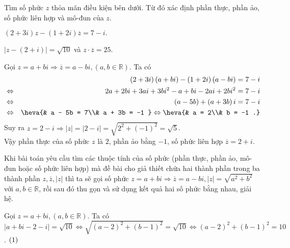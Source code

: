 \begin{vd} %
	Tìm số phức $z$ thỏa mãn điều kiện bên dưới. Từ đó xác định phần thực, phần ảo, số phức liên hợp và mô-đun của $z$.
	\begin{enumEX}{1}
		\item  $ \left( 2 + 3i \right)z - \left( 1 + 2i \right)\overline{z} = 7 - i.$
		\item 	%
		$\left| z - \left( 2 + i \right)\right| = \sqrt{10}$ và $z \cdot \overline{z} = 25$.
	\end{enumEX}
	\loigiai
	{\begin{enumEX}{1}
			\item	Gọi $z = a + bi \Rightarrow \overline{z} = a - bi, \left(a, b \in \mathbb{R}\right)$.  Ta có
			\begin{eqnarray*}
				&	& \left( 2 + 3i \right) \left( a + bi \right) - \left( 1 + 2i \right)\left( a - bi \right) = 7 - i \\
				&	\Leftrightarrow  &2a + 2bi + 3ai + 3bi^2 - a + bi - 2ai +2bi^2 = 7 - i \\ 
				&	\Leftrightarrow & \left( a - 5b \right) + \left( a+ 3b \right)i = 7 - i \\
				& \Leftrightarrow & \heva{& a - 5b = 7\\& a + 3b = -1 } \Leftrightarrow  \heva{& a = 2\\& b = -1 .} 
			\end{eqnarray*} 
			Suy ra $z = 2 - i \Rightarrow \left| z \right| = \left| 2 - i \right| = \sqrt{ 2^2 + \left( - 1 \right)^2} = \sqrt{5}$. \\
			Vậy phần thực của số phức $z$ là $2$, phần ảo bằng $-1$, số phức liên hợp $\overline{z} = 2 + i$.
			\begin{nx}
				Khi bài toán yêu cầu tìm các thuộc tính của số phức (phần thực, phần ảo,
				mô-đun hoặc số phức liên hợp) mà đề bài cho giả thiết chứa hai thành phần trong ba
				thành phần $z, \overline{z}, \left| z \right|$ thì ta sẽ gọi số phức $z = a + bi \Rightarrow \overline{z} = a - bi, \left| z \right| = \sqrt{a^2 + b^2}$ với $a, b \in \mathbb{R}$, rồi sau đó thu gọn và sử dụng kết quả hai số phức bằng nhau, giải hệ.
			\end{nx} 
			\item Gọi $z = a + bi, \left(a, b \in \mathbb{R}\right)$. Ta có \\ $\left| a + bi - 2 -i \right| = \sqrt{10} \Leftrightarrow \sqrt{\left( a - 2\right)^2 + \left( b - 1 \right)^2 } = \sqrt{10} \Leftrightarrow \left( a - 2 \right)^2 + \left( b - 1\right)^2 = 10$. $\hfill{(1)}$\\

\end{enumEX}}
\end{vd}
